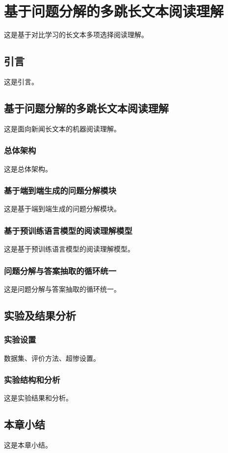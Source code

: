 \chapter{基于问题分解的多跳长文本阅读理解}

这是基于对比学习的长文本多项选择阅读理解。


\section{引言}

这是引言。


\section{基于问题分解的多跳长文本阅读理解}

这是面向新闻长文本的机器阅读理解。

\subsection{总体架构}

这是总体架构。

\subsection{基于端到端生成的问题分解模块}

这是基于端到端生成的问题分解模块。

\subsection{基于预训练语言模型的阅读理解模型}

这是基于预训练语言模型的阅读理解模型。

\subsection{问题分解与答案抽取的循环统一}

这是问题分解与答案抽取的循环统一。


\section{实验及结果分析}

\subsection{实验设置}

数据集、评价方法、超惨设置。

\subsection{实验结构和分析}

这是实验结果和分析。


\section{本章小结}

这是本章小结。


